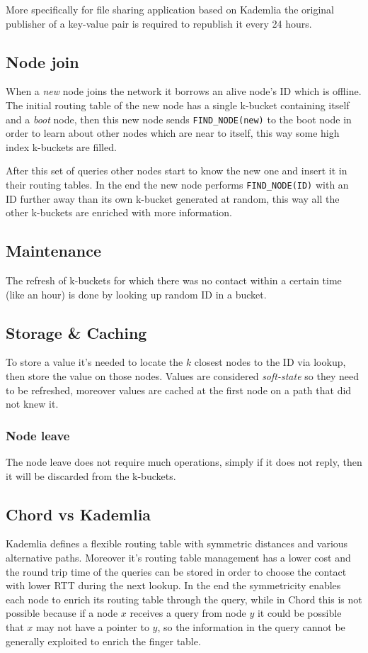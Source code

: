 More specifically for file sharing application based on Kademlia the original publisher of a key-value pair is required to republish it every 24 hours.

\subsection{Node join}
When a \emph{new} node joins the network it borrows an alive node's ID which is offline.
The initial routing table of the new node has a single k-bucket containing itself and a \emph{boot} node, then this new node sends \verb|FIND_NODE(new)| to the boot node in order to learn about other nodes which are near to itself, this way some high index k-buckets are filled.

After this set of queries other nodes start to know the new one and insert it in their routing tables.
In the end the new node performs \verb|FIND_NODE(ID)| with an ID further away than its own k-bucket generated at random, this way all the other k-buckets are enriched with more information.

\subsection{Maintenance}
The refresh of k-buckets for which there was no contact within a certain time (like an hour) is done by looking up random ID in a  bucket.

\subsection{Storage \& Caching}
To store a value it's needed to locate the $k$ closest nodes to the ID via lookup, then store the value on those nodes.
Values are considered \emph{soft-state} so they need to be refreshed, moreover values are cached at the first node on a path that did not knew it.

\subsubsection{Node leave}
The node leave does not require much operations, simply if it does not reply, then it will be discarded from the k-buckets.

\subsection{Chord vs Kademlia}
Kademlia defines a flexible routing table with symmetric distances and various alternative paths.
Moreover it's routing table management has a lower cost and the round trip time of the queries can be stored in order to choose the contact with lower RTT during the next lookup.
In the end the symmetricity enables each node to enrich its routing table through the query, while in Chord this is not possible because if a node $x$ receives a query from node $y$ it could be possible that $x$ may not have a pointer to $y$, so the information in the query cannot be generally exploited to enrich the finger table.

